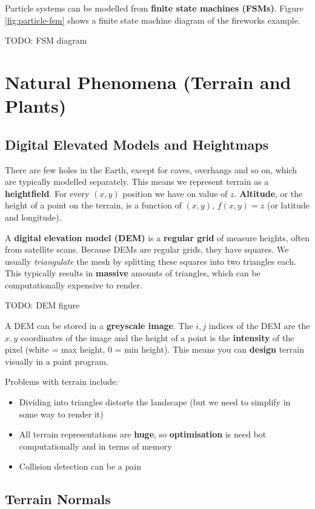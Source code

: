 \documentclass{article}
\begin{document}
Particle systems can be modelled from \textbf{finite state machines (FSMs)}. Figure \ref{fig:particle-fsm} shows a finite state machine diagram of the fireworks example.

TODO: FSM diagram

\section{Natural Phenomena (Terrain and Plants)}

\subsection{Digital Elevated Models and Heightmaps}

There are few holes in the Earth, except for caves, overhangs and so on, which are typically modelled separately. This means we represent terrain as a \textbf{heightfield}. For every $(x, y)$ position we have on value of $z$. \textbf{Altitude}, or the height of a point on the terrain, is a function of $(x, y)$, $f(x, y) = z$ (or latitude and longitude).

A \textbf{digital elevation model (DEM)} is a \textbf{regular grid} of measure heights, often from satellite scans. Because DEMs are regular grids, they have squares. We usually \textit{triangulate} the mesh by splitting these squares into two triangles each. This typically results in \textbf{massive} amounts of triangles, which can be computationally expensive to render.

TODO: DEM figure

A DEM can be stored in a \textbf{greyscale image}. The $i,j$ indices of the DEM are the $x,y$ coordinates of the image and the height of a point is the \textbf{intensity} of the pixel (white = max height, 0 = min height). This means you can \textbf{design} terrain visually in a paint program.

Problems with terrain include:
\begin{itemize}
	\item Dividing into triangles distorts the landscape (but we need to simplify in some way to render it)
	\item All terrain representations are \textbf{huge}, so \textbf{optimisation} is need bot computationally and in terms of memory
	\item Collision detection can be a pain
\end{itemize}

\subsection{Terrain Normals}
\end{document}
